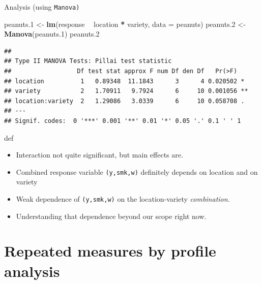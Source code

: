 \documentclass[ignorenonframetext,]{beamer}
\newenvironment{Shaded}{\begin{snugshade}}{\end{snugshade}}
\newcommand{\DataTypeTok}[1]{\textcolor[rgb]{0.13,0.29,0.53}{#1}}
\newcommand{\FloatTok}[1]{\textcolor[rgb]{0.00,0.00,0.81}{#1}}
\newcommand{\KeywordTok}[1]{\textcolor[rgb]{0.13,0.29,0.53}{\textbf{#1}}}
\newcommand{\NormalTok}[1]{#1}
\newcommand{\OperatorTok}[1]{\textcolor[rgb]{0.81,0.36,0.00}{\textbf{#1}}}
\newcommand{\StringTok}[1]{\textcolor[rgb]{0.31,0.60,0.02}{#1}}
\begin{document}
\begin{frame}[fragile]{Analysis (using \texttt{Manova)}}
\protect\hypertarget{analysis-using-manova}{}

\begin{Shaded}
\begin{Highlighting}[]
\NormalTok{peanuts}\FloatTok{.1}\NormalTok{ <-}\StringTok{ }\KeywordTok{lm}\NormalTok{(response }\OperatorTok{~}\StringTok{ }\NormalTok{location }\OperatorTok{*}\StringTok{ }\NormalTok{variety, }\DataTypeTok{data =}\NormalTok{ peanuts)}
\NormalTok{peanuts}\FloatTok{.2}\NormalTok{ <-}\StringTok{ }\KeywordTok{Manova}\NormalTok{(peanuts}\FloatTok{.1}\NormalTok{)}
\NormalTok{peanuts}\FloatTok{.2}
\end{Highlighting}
\end{Shaded}

\begin{verbatim}
## 
## Type II MANOVA Tests: Pillai test statistic
##                  Df test stat approx F num Df den Df   Pr(>F)   
## location          1   0.89348  11.1843      3      4 0.020502 * 
## variety           2   1.70911   9.7924      6     10 0.001056 **
## location:variety  2   1.29086   3.0339      6     10 0.058708 . 
## ---
## Signif. codes:  0 '***' 0.001 '**' 0.01 '*' 0.05 '.' 0.1 ' ' 1
\end{verbatim}

def

\begin{itemize}
\item
  Interaction not quite significant, but main effects are.
\item
  Combined response variable \texttt{(y,smk,w)} definitely depends on
  location and on variety
\item
  Weak dependence of \texttt{(y,smk,w)} on the location-variety
  \emph{combination.}
\item
  Understanding that dependence beyond our scope right now.
\end{itemize}

\section{Repeated measures by profile analysis}
\frame{\sectionpage}

\end{frame}
\end{document}
